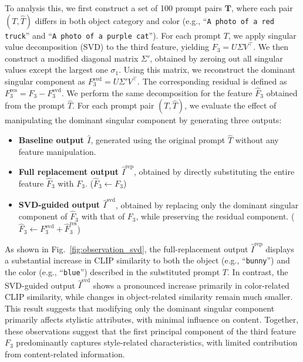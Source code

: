 \documentclass[10pt,twocolumn,letterpaper]{article}
\newcommand{\figref}[1]{Fig.~\ref{#1}}
\begin{document}
To analysis this, we first construct a set of 100 prompt pairs $\mathbf{T}$, where each pair $(T, \hat{T})$ differs in both object category and color (e.g., ``\texttt{A photo of a red truck}'' and ``\texttt{A photo of a purple cat}''). 
For each prompt $T$, we apply singular value decomposition (SVD) to the third feature, yielding $F_3 = U \Sigma V^\top$. We then construct a modified diagonal matrix $\Sigma'$, obtained by zeroing out all singular values except the largest one $\sigma_1$. Using this matrix, we reconstruct the dominant singular component as $F_3^{\text{svd}} = U \Sigma' V^\top$. The corresponding residual is defined as $F_3^{\text{res}} = F_3 - F_3^{\text{svd}}$. We perform the same decomposition for the feature $\hat{F}_3$ obtained from the prompt $\hat{T}$.
For each prompt pair $(T, \hat{T})$, we evaluate the effect of manipulating the dominant singular component by generating three outputs:
\begin{itemize}
	\item \textbf{Baseline output $\hat{I}$}, generated using the original prompt $\hat{T}$ without any feature manipulation.
	\item \textbf{Full replacement output $\hat{I}^{\text{rep}}$}, obtained by directly substituting the entire feature $\hat{F}_3$ with ${F}_3$. ($\hat{F}_3 \leftarrow {F}_3$)
	\item \textbf{SVD-guided output $\hat{I}^{\text{svd}}$}, obtained by replacing only the dominant singular component of $\hat{F}_3$ with that of ${F}_3$, while preserving the residual component. ($\hat{F}_3 \leftarrow {F}_3^{\text{svd}}+\hat{F}_3^{\text{res}}$)
\end{itemize}

As shown in \figref{fig:observation_svd}, the full-replacement output $\hat{I}^{\text{rep}}$ displays a substantial increase in CLIP similarity to both the object (e.g., ``\texttt{bunny}'') and the color (e.g., ``\texttt{blue}'') described in the substituted prompt ${T}$. In contrast, the SVD-guided output $\hat{I}^{\text{svd}}$ shows a pronounced increase primarily in color-related CLIP similarity, while changes in object-related similarity remain much smaller. This result suggests that modifying only the dominant singular component primarily affects stylistic attributes, with minimal influence on content. Together, these observations suggest that the first principal component of the third feature $F_3$ predominantly captures style-related characteristics, with limited contribution from content-related information. 
\end{document}

